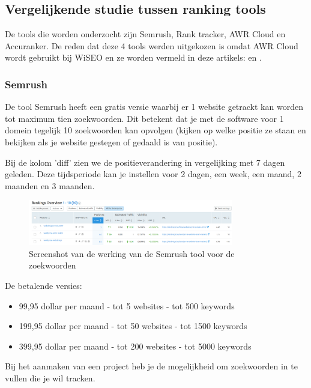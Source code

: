 \subsection{Vergelijkende studie tussen ranking tools}
\label{ch: Vergelijkende studie tussen ranking tools}

De tools die worden onderzocht zijn Semrush, Rank tracker, AWR Cloud en Accuranker. De reden dat deze 4 tools werden uitgekozen is omdat AWR Cloud wordt gebruikt bij WiSEO en ze worden vermeld in deze artikels: \textcite{SEO13} en \textcite{SEOCOMPLETE}.  

\subsubsection{Semrush}
\label{ch: Semrush}
De tool Semrush heeft een gratis versie waarbij er 1 website getrackt kan worden tot maximum tien zoekwoorden. Dit betekent dat je met de software voor 1 domein tegelijk 10 zoekwoorden kan opvolgen (kijken op welke positie ze staan en bekijken als je website gestegen of gedaald is van positie). 

Bij de kolom 'diff' zien we de positieverandering in vergelijking met 7 dagen geleden. Deze tijdsperiode kan je instellen voor 2 dagen, een week, een maand, 2 maanden en 3 maanden. 

\begin{figure}[h!]
\centering
\includegraphics[width=0.8\textwidth]{img/semrushranking.PNG}
\caption{Screenshot van de werking van de Semrush tool voor de zoekwoorden
\autocite{semrush}}
\end{figure}

De betalende versies: 
\begin{itemize}
\item 99,95 dollar per maand - tot 5 websites - tot 500 keywords
\item 199,95 dollar per maand - tot 50 websites - tot 1500 keywords
\item 399,95 dollar per maand - tot 200 websites - tot 5000 keywords
\end{itemize}

Bij het aanmaken van een project heb je de mogelijkheid om zoekwoorden in te vullen die je wil tracken. 

